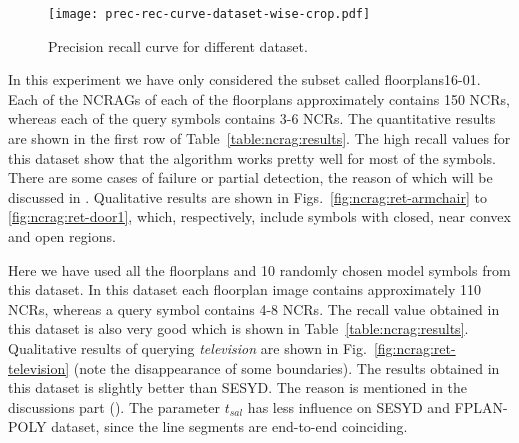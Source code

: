 \begin{figure}[H]
\centering
\texttt{[image: prec-rec-curve-dataset-wise-crop.pdf]}
\caption{Precision recall curve for different dataset.}
\label{fig:ncrag:prec-rec-curve}
\end{figure}

In this experiment we have only considered the subset called floorplans16-01. Each of the NCRAGs of each of the floorplans approximately contains 150 NCRs, whereas each of the query symbols contains 3-6 NCRs. The quantitative results are shown in the first row of Table~\ref{table:ncrag:results}. The high recall values for this dataset show that the algorithm works pretty well for most of the symbols. There are some cases of failure or partial detection, the reason of which will be discussed in . Qualitative results are shown in Figs.~\ref{fig:ncrag:ret-armchair} to \ref{fig:ncrag:ret-door1}, which, respectively, include symbols with closed, near convex and open regions.

Here we have used all the floorplans and 10 randomly chosen model symbols from this dataset. In this dataset each floorplan image contains approximately 110 NCRs, whereas a query symbol contains 4-8 NCRs. The recall value obtained in this dataset is also very good which is shown in Table~\ref{table:ncrag:results}. Qualitative results of querying \textit{television} are shown in Fig.~\ref{fig:ncrag:ret-television} (note the disappearance of some boundaries). The results obtained in this dataset is slightly better than SESYD. The reason is mentioned in the discussions part (). The parameter $t_{sal}$ has less influence on SESYD and FPLAN-POLY dataset, since the line segments are end-to-end coinciding.

